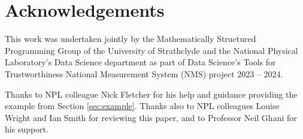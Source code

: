 \documentclass{IMEKO2024}
\begin{document}
\section{Acknowledgements}

This work was undertaken jointly by the Mathematically Structured Programming Group of the University of Strathclyde and the National Physical Laboratory’s Data Science department as part of Data Science’s Tools for Trustworthiness National Measurement System (NMS) project 2023 – 2024.

Thanks to NPL colleague Nick Fletcher for his help and guidance providing the example from Section \ref{sec:example}. Thanks also to NPL colleagues Louise Wright and Ian Smith for reviewing this paper, and to Professor Neil Ghani for his support.

%


\end{document}
